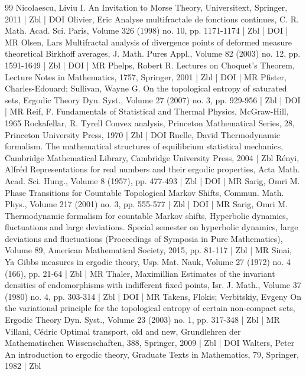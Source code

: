 \begin{thebibliography}{99}
Nicolaescu, Liviu I. An Invitation to Morse Theory, Universitext, Springer, 2011 | Zbl | DOI
Olivier, Eric Analyse multifractale de fonctions continues, C. R. Math. Acad. Sci. Paris, Volume 326 (1998) no. 10, pp. 1171-1174 | Zbl | DOI | MR
Olsen, Lars Multifractal analysis of divergence points of deformed measure theoretical Birkhoff averages, J. Math. Pures Appl., Volume 82 (2003) no. 12, pp. 1591-1649 | Zbl | DOI | MR
Phelps, Robert R. Lectures on Choquet’s Theorem, Lecture Notes in Mathematics, 1757, Springer, 2001 | Zbl | DOI | MR
Pfister, Charles-Edouard; Sullivan, Wayne G. On the topological entropy of saturated sets, Ergodic Theory Dyn. Syst., Volume 27 (2007) no. 3, pp. 929-956 | Zbl | DOI | MR
Reif, F. Fundamentals of Statistical and Thermal Physics, McGraw-Hill, 1965
Rockafellar, R. Tyrell Convex analysis, Princeton Mathematical Series, 28, Princeton University Press, 1970 | Zbl | DOI
Ruelle, David Thermodynamic formalism. The mathematical structures of equilibrium statistical mechanics, Cambridge Mathematical Library, Cambridge University Press, 2004 | Zbl
Rényi, Alfréd Representations for real numbers and their ergodic properties, Acta Math. Acad. Sci. Hung., Volume 8 (1957), pp. 477-493 | Zbl | DOI | MR
Sarig, Omri M. Phase Transitions for Countable Topological Markov Shifts, Commun. Math. Phys., Volume 217 (2001) no. 3, pp. 555-577 | Zbl | DOI | MR
Sarig, Omri M. Thermodynamic formalism for countable Markov shifts, Hyperbolic dynamics, fluctuations and large deviations. Special semester on hyperbolic dynamics, large deviations and fluctuations (Proceedings of Symposia in Pure Mathematics), Volume 89, American Mathematical Society, 2015, pp. 81-117 | Zbl | MR
Sinai, Ya Gibbs measures in ergodic theory, Usp. Mat. Nauk, Volume 27 (1972) no. 4 (166), pp. 21-64 | Zbl | MR
Thaler, Maximillian Estimates of the invariant densities of endomorphisms with indifferent fixed points, Isr. J. Math., Volume 37 (1980) no. 4, pp. 303-314 | Zbl | DOI | MR
Takens, Flokis; Verbitskiy, Evgeny On the variational principle for the topological entropy of certain non-compact sets, Ergodic Theory Dyn. Syst., Volume 23 (2003) no. 1, pp. 317-348 | Zbl | MR
Villani, Cédric Optimal transport, old and new, Grundlehren der Mathematischen Wissenschaften, 388, Springer, 2009 | Zbl | DOI
Walters, Peter An introduction to ergodic theory, Graduate Texts in Mathematics, 79, Springer, 1982 | Zbl
\end{thebibliography}
